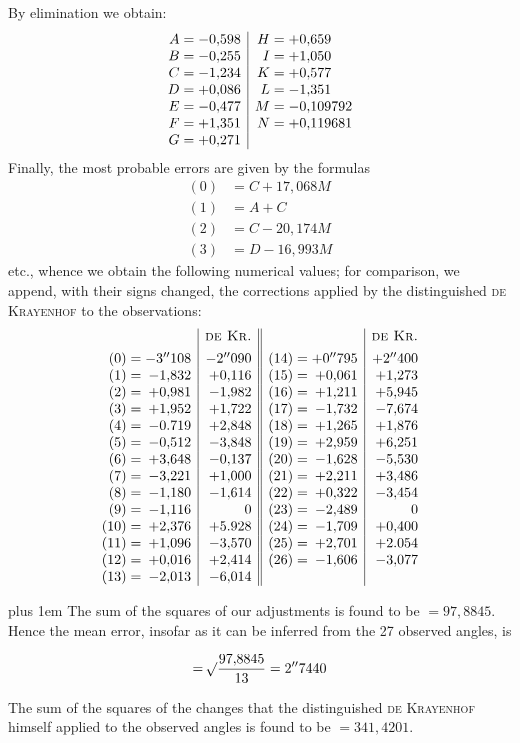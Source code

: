 By elimination we obtain:
\[
\begin{array}{r@{\;}c@{\;}l|r@{\;}c@{\;}l}
A&=&-0{,}598&H&=&+0{,}659\\
B&=&-0{,}255&I&=&+1{,}050\\
C&=&-1{,}234&K&=&+0{,}577\\
D&=&+0{,}086&L&=&-1{,}351\\
E&=&-0{,}477&M&=&-0{,}109792\\
F&=&+1{,}351&N&=&+0{,}119681\\
G&=&+0{,}271&&&
\end{array}
\]
Finally, the most probable errors are given by the formulas
\[
\begin{aligned}
(0)&=C+17{,}068M\\
(1)&=A+C\\
(2)&=C-20{,}174M\\
(3)&=D-16{,}993M
\end{aligned}
\]
etc., whence we obtain the following numerical values; for comparison, we append, with their signs changed, the corrections applied by the distinguished \textsc{de Krayenhof} to the observations:
\[
\begin{array}{r@{\;}c@{\;}r|r||r@{\;}c@{\;}r|r}
&&&\text{\textsc{de Kr.}}&&&&\text{\textsc{de Kr.}}\\[4pt]
(0)&=&-3''108&-2''090&(14)&=&+0''795&+2''400\\
(1)&=&-1{,}832&+0{,}116&(15)&=&+0{,}061&+1{,}273\\
(2)&=&+0{,}981&-1{,}982&(16)&=&+1{,}211&+5{,}945\\
(3)&=&+1{,}952&+1{,}722&(17)&=&-1{,}732&-7{,}674\\
(4)&=&-0.719&+2{,}848&(18)&=&+1{,}265&+1{,}876\\
(5)&=&-0{,}512&-3{,}848&(19)&=&+2{,}959&+6{,}251\\
(6)&=&+3{,}648&-0{,}137&(20)&=&-1{,}628&-5{,}530\\
(7)&=&-3{,}221&+1{,}000&(21)&=&+2{,}211&+3{,}486\\
(8)&=&-1{,}180&-1{,}614&(22)&=&+0{,}322&-3{,}454\\
(9)&=&-1{,}116&0&(23)&=&-2{,}489&0\\
(10)&=&+2{,}376&+5.928&(24)&=&-1{,}709&+0{,}400\\
(11)&=&+1{,}096&-3{,}570&(25)&=&+2{,}701&+2.054\\
(12)&=&+0{,}016&+2{,}414&(26)&=&-1{,}606&-3{,}077\\
(13)&=&-2{,}013&-6{,}014&&&&
\end{array}
\]

{\rightskip=0pt plus 1em The sum of the squares of our adjustments is found to be \(=97{,}8845\). Hence the mean error, insofar as it can be inferred from the 27 observed angles, is\par}
\[
=\mathord{{}^{}\!\surd}\frac{97{,}8845}{13}=2''7440
\]

The sum of the squares of the changes that the distinguished \textsc{de Krayenhof} himself applied to the observed angles is found to be \(=341{,}4201\).

